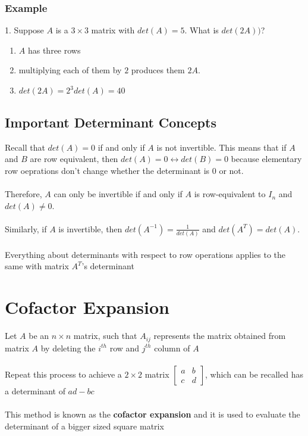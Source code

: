 \begin{enumerate}
\subsubsection{Example}
1. Suppose $A$ is a $3 \times 3$ matrix with $det(A) = 5$. What is 
$det(2A))$?
\begin{enumerate}
  \item $A$ has three rows 
  \item multiplying each of them by $2$ produces them $2A$. 
  \item $det(2A) = 2^3det(A) = 40$ 
\end{enumerate}
\subsection{Important Determinant Concepts}
Recall that $det(A) = 0$ if and only if $A$ is not invertible. This means that if $A$ and $B$ are row equivalent, then $det(A) = 0 \leftrightarrow det(B) = 0$ because elementary row oeprations don't change whether 
the determinant is $0$ or not. \\\\
Therefore, $A$ can only be invertible if and only if $A$ is row-equivalent to $I_n$ and $det(A) \neq 0$. \\\\
Similarly, if $A$ is invertible, then $det(A^{-1}) = \frac{1}{det(A)}$ and $det(A^T) = det(A)$. \\\\
Everything about determinants with respect to row operations applies to the same with matrix $A^T$'s determinant
\section{Cofactor Expansion}
Let $A$ be an $n \times n$ matrix, such that $A_{ij}$ represents 
the matrix obtained from matrix $A$ by deleting the $i^{th}$ row and 
$j^{th}$ column of $A$ \\\\
Repeat this process to achieve a $2 \times 2$ matrix 
  $\begin{bmatrix} a & b \\ c & d \end{bmatrix}$, which can be
recalled has a determinant of $ad - bc$ \\\\
This method is known as the \textbf{cofactor expansion} and it is 
used to evaluate the determinant of a bigger sized square matrix

\end{enumerate}
